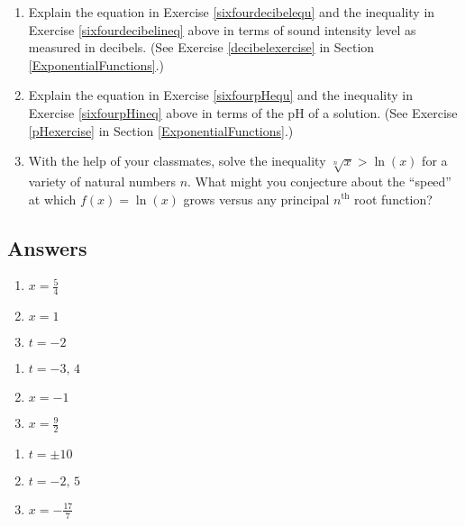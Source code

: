 \begin{enumerate}
\item Explain the equation in Exercise \ref{sixfourdecibelequ} and the inequality in Exercise \ref{sixfourdecibelineq} above in terms of sound intensity level as measured in decibels.  (See Exercise \ref{decibelexercise} in Section \ref{ExponentialFunctions}.)

\item Explain the equation in Exercise \ref{sixfourpHequ} and the inequality in Exercise \ref{sixfourpHineq} above in terms of the pH of a solution.  (See Exercise \ref{pHexercise} in Section \ref{ExponentialFunctions}.)

\item With the help of your classmates, solve the inequality $\sqrt[n]{x} > \ln(x)$ for a variety of natural numbers $n$.  What might you conjecture about the ``speed'' at which $f(x) = \ln(x)$ grows versus any principal $n^{\textrm{th}}$ root function?

\end{enumerate}

\newpage

\subsection{Answers}
\begin{multicols}{3}
\begin{enumerate}

\item $x = \frac{5}{4}$
\item $x = 1$
\item $t=-2$

\setcounter{HW}{\value{enumi}}
\end{enumerate}
\end{multicols}

\begin{multicols}{3}
\begin{enumerate}
\setcounter{enumi}{\value{HW}}

\item $t=-3,\, 4$
\item $x=-1$
\item $x=\frac{9}{2}$

\setcounter{HW}{\value{enumi}}
\end{enumerate}
\end{multicols}

\begin{multicols}{3}
\begin{enumerate}
\setcounter{enumi}{\value{HW}}

\item $t=\pm 10$
\item $t=-2,\, 5$
\item $x = -\frac{17}{7}$

\setcounter{HW}{\value{enumi}}
\end{enumerate}
\end{multicols}

